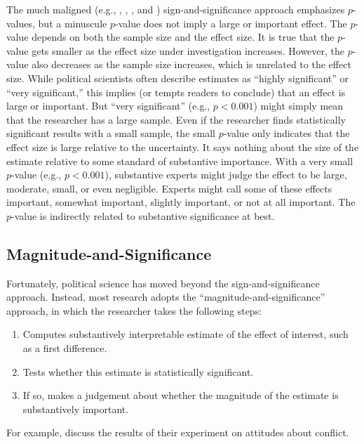 \documentclass[12pt]{article}
\begin{document}
The much maligned (e.g., \citealt{Cohen1990}, \citealt{Gill1999}, \citealt{HillJones2014}, and \citealt{Gross2014}) sign-and-significance approach emphasizes $p$-values, but a minuscule $p$-value does not imply a large or important effect. The $p$-value depends on both the sample size and the effect size. It is true that the $p$-value gets smaller as the effect size under investigation increases. However, the $p$-value also decreases as the sample size increases, which is unrelated to the effect size. While political scientists often describe estimates as ``highly significant'' or ``very significant,'' this implies (or tempts readers to conclude) that an effect is large or important. But ``very significant'' (e.g., $p < 0.001$) might simply mean that the researcher has a large sample. Even if the researcher finds statistically significant results with a small sample, the small $p$-value only indicates that the effect size is large relative to the uncertainty. It says nothing about the size of the estimate relative to some standard of substantive importance. With a very small $p$-value (e.g., $p < 0.001$), substantive experts might judge the effect to be large, moderate, small, or even negligible. Experts might call some of these effects important, somewhat important, slightly important, or not at all important. The $p$-value is indirectly related to substantive significance at best.

\subsection*{Magnitude-and-Significance}

Fortunately, political science has moved beyond the sign-and-significance approach. Instead, most research adopts the ``magnitude-and-significance'' approach, in which the researcher takes the following steps: 

\begin{enumerate}
\item Computes substantively interpretable estimate of the effect of interest, such as a first difference.
\item Tests whether this estimate is statistically significant.
\item If so, makes a judgement about whether the magnitude of the estimate is substantively important.
\end{enumerate}

For example, \cite{TomzWeeks2013} discuss the results of their experiment on attitudes about conflict.
\end{document}

